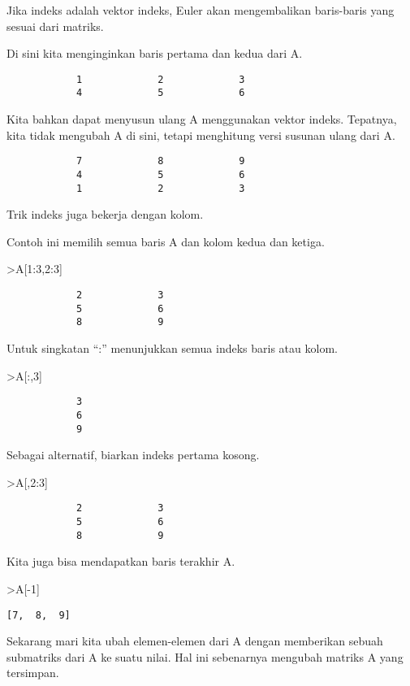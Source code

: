 \documentclass[
]{book}
\begin{document}
Jika indeks adalah vektor indeks, Euler akan mengembalikan baris-baris yang sesuai dari matriks.

Di sini kita menginginkan baris pertama dan kedua dari A.

\begin{verbatim}
            1             2             3 
            4             5             6 
\end{verbatim}

Kita bahkan dapat menyusun ulang A menggunakan vektor indeks. Tepatnya, kita tidak mengubah A di sini, tetapi menghitung versi susunan ulang dari A.

\begin{verbatim}
            7             8             9 
            4             5             6 
            1             2             3 
\end{verbatim}

Trik indeks juga bekerja dengan kolom.

Contoh ini memilih semua baris A dan kolom kedua dan ketiga.

\textgreater A{[}1:3,2:3{]}

\begin{verbatim}
            2             3 
            5             6 
            8             9 
\end{verbatim}

Untuk singkatan ``:'' menunjukkan semua indeks baris atau kolom.

\textgreater A{[}:,3{]}

\begin{verbatim}
            3 
            6 
            9 
\end{verbatim}

Sebagai alternatif, biarkan indeks pertama kosong.

\textgreater A{[},2:3{]}

\begin{verbatim}
            2             3 
            5             6 
            8             9 
\end{verbatim}

Kita juga bisa mendapatkan baris terakhir A.

\textgreater A{[}-1{]}

\begin{verbatim}
[7,  8,  9]
\end{verbatim}

Sekarang mari kita ubah elemen-elemen dari A dengan memberikan sebuah submatriks dari A ke suatu nilai. Hal ini sebenarnya mengubah matriks A yang tersimpan.
\end{document}
